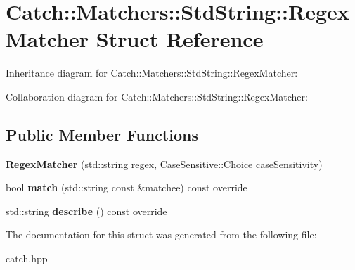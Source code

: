 \hypertarget{structCatch_1_1Matchers_1_1StdString_1_1RegexMatcher}{}\section{Catch\+:\+:Matchers\+:\+:Std\+String\+:\+:Regex\+Matcher Struct Reference}
\label{structCatch_1_1Matchers_1_1StdString_1_1RegexMatcher}


Inheritance diagram for Catch\+:\+:Matchers\+:\+:Std\+String\+:\+:Regex\+Matcher\+:


Collaboration diagram for Catch\+:\+:Matchers\+:\+:Std\+String\+:\+:Regex\+Matcher\+:
\subsection*{Public Member Functions}
\begin{DoxyCompactItemize}
\item 
{\bfseries Regex\+Matcher} (std\+::string regex, Case\+Sensitive\+::\+Choice case\+Sensitivity)\hypertarget{structCatch_1_1Matchers_1_1StdString_1_1RegexMatcher_ab914deb885fe25558c41ab368c6b3916}{}\label{structCatch_1_1Matchers_1_1StdString_1_1RegexMatcher_ab914deb885fe25558c41ab368c6b3916}

\item 
bool {\bfseries match} (std\+::string const \&matchee) const override\hypertarget{structCatch_1_1Matchers_1_1StdString_1_1RegexMatcher_aa8e61adccabb2f36133029301f6b8f4e}{}\label{structCatch_1_1Matchers_1_1StdString_1_1RegexMatcher_aa8e61adccabb2f36133029301f6b8f4e}

\item 
std\+::string {\bfseries describe} () const override\hypertarget{structCatch_1_1Matchers_1_1StdString_1_1RegexMatcher_a1f788cd5258c987e5043f6c7f43adeb9}{}\label{structCatch_1_1Matchers_1_1StdString_1_1RegexMatcher_a1f788cd5258c987e5043f6c7f43adeb9}

\end{DoxyCompactItemize}


The documentation for this struct was generated from the following file\+:\begin{DoxyCompactItemize}
\item 
catch.\+hpp\end{DoxyCompactItemize}
